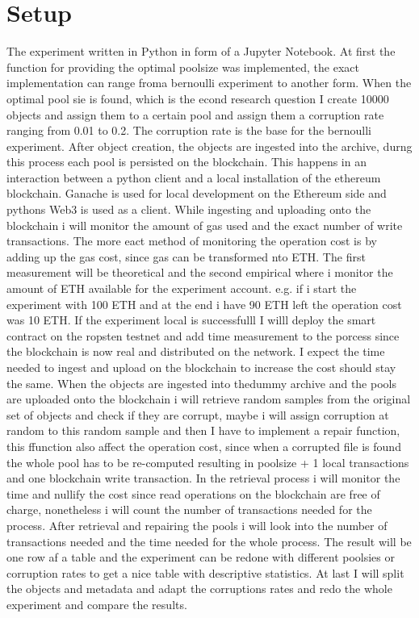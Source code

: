 \section{Setup}
The experiment written in Python in form of a Jupyter Notebook. At first the function for providing the optimal poolsize was implemented, the exact implementation can range froma bernoulli experiment to another form. When the optimal pool sie is found, which is the econd research question I create 10000 objects and assign them to a certain pool and assign them a corruption rate ranging from 0.01 to 0.2. The corruption rate is the base for the bernoulli experiment. After object creation, the objects are ingested into the archive, durng this process each pool is persisted on the blockchain. This happens in an interaction between a python client and a local installation of the ethereum blockchain. Ganache is used for local development on the Ethereum side and pythons Web3 is used as a client. While ingesting and uploading onto the blockchain i will monitor the amount of gas used and the exact number of write transactions. The more eact method of monitoring the operation cost is by adding up the gas cost, since gas can be transformed nto ETH. The first measurement will be theoretical and the second empirical where i monitor the amount of ETH available for the experiment account. e.g. if i start the experiment with 100 ETH and at the end i have 90 ETH left the operation cost was 10 ETH. If the experiment local is successfulll I willl deploy the smart contract on the ropsten testnet and add time measurement to the porcess since the blockchain is now real and distributed on the network. I expect the time needed to ingest and upload on the blockchain to increase the cost should stay the same. When the objects are ingested into thedummy archive and the pools are uploaded onto the blockchain i will retrieve random samples from the original set of objects and check if they are corrupt, maybe i will assign corruption at random to this random sample and then I have to implement a repair function, this ffunction also affect the operation cost, since when a corrupted file is found the whole pool has to be re-computed resulting in poolsize + 1 local transactions and one blockchain write transaction. In the retrieval process i will monitor the time and nullify the cost since read operations on the blockchain are free of charge, nonetheless i will count the number of transactions needed for the process. After retrieval and repairing the pools i will look into the number of transactions needed and the time needed for the whole process. The result will be one row af a table and the experiment can be redone with different poolsies or corruption rates to get a nice table with descriptive statistics. 
At last I will split the objects and metadata and adapt the corruptions rates and redo the whole experiment and compare the results. 
